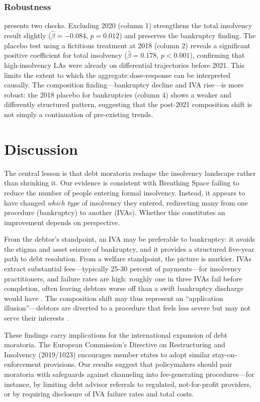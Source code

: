 \documentclass[12pt]{article}
\begin{document}
\subsubsection*{Robustness}  presents two checks. Excluding 2020 (column 1) strengthens the total insolvency result slightly ($\hat{\beta} = -0.084$, $p = 0.012$) and preserves the bankruptcy finding. The placebo test using a fictitious treatment at 2018 (column 2) reveals a significant positive coefficient for total insolvency ($\hat{\beta} = 0.178$, $p < 0.001$), confirming that high-insolvency LAs were already on differential trajectories before 2021. This limits the extent to which the aggregate dose-response can be interpreted causally. The composition finding---bankruptcy decline and IVA rise---is more robust: the 2018 placebo for bankruptcies (column 4) shows a weaker and differently structured pattern, suggesting that the post-2021 composition shift is not simply a continuation of pre-existing trends.

\section{Discussion}

The central lesson is that debt moratoria reshape the insolvency landscape rather than shrinking it. Our evidence is consistent with Breathing Space failing to reduce the number of people entering formal insolvency. Instead, it appears to have changed \textit{which type} of insolvency they entered, redirecting many from one procedure (bankruptcy) to another (IVAs). Whether this constitutes an improvement depends on perspective.

From the debtor's standpoint, an IVA may be preferable to bankruptcy: it avoids the stigma and asset seizure of bankruptcy, and it provides a structured five-year path to debt resolution. From a welfare standpoint, the picture is murkier. IVAs extract substantial fees---typically 25-30 percent of payments---for insolvency practitioners, and failure rates are high: roughly one in three IVAs fail before completion, often leaving debtors worse off than a swift bankruptcy discharge would have \citep{walters2019}. The composition shift may thus represent an ``application illusion''---debtors are diverted to a procedure that feels less severe but may not serve their interests \citep{bhargava2015}.

These findings carry implications for the international expansion of debt moratoria. The European Commission's Directive on Restructuring and Insolvency (2019/1023) encourages member states to adopt similar stay-on-enforcement provisions. Our results suggest that policymakers should pair moratoria with safeguards against channeling into fee-generating procedures---for instance, by limiting debt advisor referrals to regulated, not-for-profit providers, or by requiring disclosure of IVA failure rates and total costs.
\end{document}
